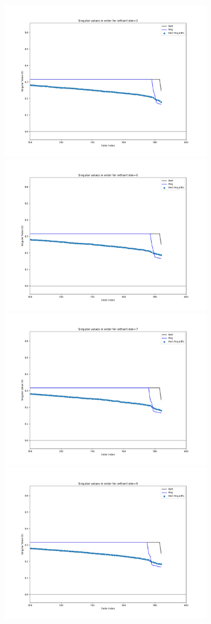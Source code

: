 \documentclass[10pt]{extarticle}
\begin{document}
\includegraphics[width=9cm]{img/e03-SVD-Orthant_origin-dim-cropped5.png}
\includegraphics[width=9cm]{img/e03-SVD-Orthant_origin-dim-cropped6.png}
\includegraphics[width=9cm]{img/e03-SVD-Orthant_origin-dim-cropped7.png}
\includegraphics[width=9cm]{img/e03-SVD-Orthant_origin-dim-cropped8.png}
\end{document}
